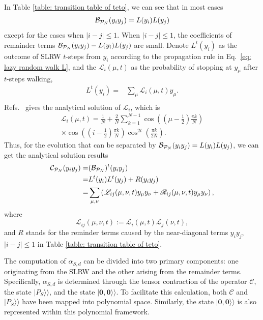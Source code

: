 \documentclass[showpacs,twocolumn,aps,prx,long bibliography,superscriptaddress,notitlepage]{revtex4-1}
\newcommand{\supket}[1]{|#1 \rangle\rangle}
\begin{document}
In Table \ref{table: transition table of teto}, we can see that in most cases 
\begin{equation}
    \mathcal{B}_{\mathcal{P}_N}(y_i y_j) = L(y_i) L(y_j)
\end{equation}
except for the cases when $|i-j|\leq 1$. 
When $|i-j|\leq 1$, the coefficients of remainder terms $\mathcal{B}_{\mathcal{P}_N}(y_i y_j) - L(y_i)L(y_j)$ are small. 
Denote $L^t(y_i)$ as the outcome of SLRW $t$-steps from $y_i$ according to the propagation rule in Eq.~\eqref{eq: lazy random walk L}, and the $\mathcal{L}_{i}(\mu, t)$ as the probability of stopping at $y_\mu$ after $t$-steps walking,
\begin{equation}
    \begin{aligned}
    L^t(y_i) =& \sum_\mu \mathcal{L}_{i}(\mu, t) y_\mu. \\
    \end{aligned}
\end{equation}
Refs.~\cite{giuggioli2020exact} gives the analytical solution of $\mathcal{L}_{i}$, which is 
\begin{equation}
    \begin{aligned}
        \mathcal{L}_{i}(\mu, t) = \frac{1}{N} + \frac{2}{N} \sum_{k=1}^{N-1} \cos \left(\left(\mu-\frac{1}{2}\right) \frac{\pi k}{N}\right)  \\
        \times \cos \left(\left(i-\frac{1}{2}\right) \frac{\pi k}{N}\right) \cos^{2 t} \left(\frac{\pi k}{2 N}\right).
    \end{aligned}
\end{equation}
Thus, for the evolution that can be separated by $\mathcal{B}_{\mathcal{P}_N}(y_iy_j) = L(y_i) L(y_j)$, we can get the analytical solution results
\begin{align}
    \mathcal{C}_{\mathcal{P}_N} (y_i y_j) =& (\mathcal{B}_{\mathcal{P}_N})^t (y_i y_j) \\
    =& L^t(y_i)L^t(y_j) + R(y_iy_j)\\
    \label{eq: zz anonymous 7}
    =&\sum_{\mu,\nu} \left(\mathscr{L}_{ij} (\mu, \nu, t) y_\mu y_\nu + \mathscr{R}_{ij} (\mu, \nu, t) y_\mu y_\nu\right),
\end{align}
where
\begin{equation}
    \mathscr{L}_{ij} (\mu, \nu, t) := \mathcal{L}_{i}(\mu, t)\mathcal{L}_{j}(\nu, t),
    \label{eq:L_ij_deviation}
\end{equation}
and $R$ stands for the reminder terms caused by the near-diagonal terms $y_i y_j$, $|i-j| \leq 1$ in Table \ref{table: transition table of teto}. 

The computation of \(\alpha_{S,d}\) can be divided into two primary components: one originating from the SLRW and the other arising from the remainder terms. Specifically, \(\alpha_{S,d}\) is determined through the tensor contraction of the operator \(\mathcal{C}\), the state \(\supket{P_S}\), and the state \(\supket{\bm{0}, \bm{0}}\). To facilitate this calculation, both \(\mathcal{C}\) and \(\supket{P_S}\) have been mapped into polynomial space. Similarly, the state \(\supket{\bm{0}, \bm{0}}\) is also represented within this polynomial framework. 
\end{document}
